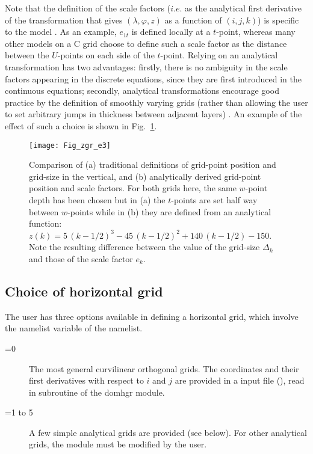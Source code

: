 \documentclass[NEMO_book]{subfiles}
\begin{document}
Note that the definition of the scale factors ($i.e.$ as the analytical first derivative 
of the transformation that gives $(\lambda,\varphi,z)$ as a function of $(i,j,k)$) is 
specific to the \NEMO model \citep{Marti_al_JGR92}. As an example, $e_{1t}$ is defined 
locally at a $t$-point, whereas many other models on a C grid choose to define 
such a scale factor as the distance between the $U$-points on each side of the 
$t$-point. Relying on an analytical transformation has two advantages: firstly, there 
is no ambiguity in the scale factors appearing in the discrete equations, since they 
are first introduced in the continuous equations; secondly, analytical transformations 
encourage good practice by the definition of smoothly varying grids (rather than 
allowing the user to set arbitrary jumps in thickness between adjacent layers) 
\citep{Treguier1996}. An example of the effect of such a choice is shown in 
Fig.~\ref{Fig_zgr_e3}.
\begin{figure}[!t]     \begin{center}
\texttt{[image: Fig\_zgr\_e3]}
\caption{ \label{Fig_zgr_e3}    
Comparison of (a) traditional definitions of grid-point position and grid-size in the vertical, 
and (b) analytically derived grid-point position and scale factors. 
For both grids here,  the same $w$-point depth has been chosen but in (a) the 
$t$-points are set half way between $w$-points while in (b) they are defined from 
an analytical function: $z(k)=5\,(k-1/2)^3 - 45\,(k-1/2)^2 + 140\,(k-1/2) - 150$. 
Note the resulting difference between the value of the grid-size $\Delta_k$ and 
those of the scale factor $e_k$. }
\end{center}   \end{figure}

\subsection{Choice of horizontal grid}
\label{DOM_hgr_msh_choice}

The user has three options available in defining a horizontal grid, which involve 
the namelist variable  of the  namelist. 
\begin{description}
\item[=0]  The most general curvilinear orthogonal grids.
The coordinates and their first derivatives with respect to $i$ and $j$ are provided
in a input file (), read in  subroutine of the domhgr module.
\item[=1 to 5] A few simple analytical grids are provided (see below). 
For other analytical grids, the  module must be modified by the user. 
\end{description}
\end{document}
